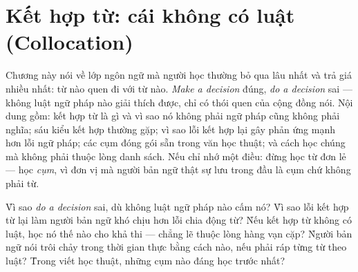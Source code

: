 \documentclass[../../english.tex]{subfiles}
\begin{document}
\chapter{Kết hợp từ: cái không có luật (Collocation)}

\begin{tomtat}
Chương này nói về lớp ngôn ngữ mà người học thường bỏ qua lâu nhất và trả giá nhiều nhất: từ nào quen đi với từ nào. \emph{Make a decision} đúng, \emph{do a decision} sai --- không luật ngữ pháp nào giải thích được, chỉ có thói quen của cộng đồng nói. Nội dung gồm: kết hợp từ là gì và vì sao nó không phải ngữ pháp cũng không phải nghĩa; sáu kiểu kết hợp thường gặp; vì sao lỗi kết hợp lại gây phản ứng mạnh hơn lỗi ngữ pháp; các cụm đóng gói sẵn trong văn học thuật; và cách học chúng mà không phải thuộc lòng danh sách. Nếu chỉ nhớ một điều: đừng học từ đơn lẻ --- học \emph{cụm}, vì đơn vị mà người bản ngữ thật sự lưu trong đầu là cụm chứ không phải từ.
\end{tomtat}

\begin{nentang}
\end{nentang}

\begin{khoigoi}
\h{Vì sao \emph{do a decision} sai, dù không luật ngữ pháp nào cấm nó?}
\h{Vì sao lỗi kết hợp từ lại làm người bản ngữ khó chịu hơn lỗi chia động từ?}
\h{Nếu kết hợp từ không có luật, học nó thế nào cho khả thi --- chẳng lẽ thuộc lòng hàng vạn cặp?}
\h{Người bản ngữ nói trôi chảy trong thời gian thực bằng cách nào, nếu phải ráp từng từ theo luật?}
\h{Trong viết học thuật, những cụm nào đáng học trước nhất?}
\end{khoigoi}
\end{document}
